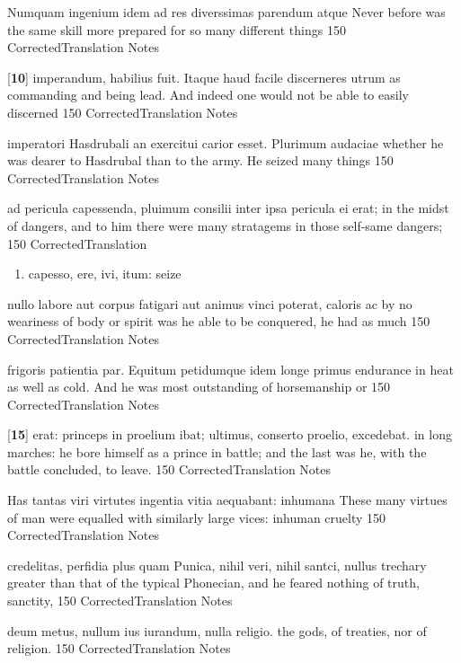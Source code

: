 \latline
  {Numquam ingenium idem ad res diverssimas parendum atque}
  { Never before was the same skill more prepared for so many different things  }
  {150}
  { CorrectedTranslation }
  { Notes }


\latline
  {[\textbf{10}] imperandum, habilius fuit.  Itaque haud facile discerneres utrum}
  { as commanding and being lead.  And indeed one would not be able to easily discerned }
  {150}
  { CorrectedTranslation }
  { Notes }


\latline
  {imperatori Hasdrubali an exercitui carior esset.  Plurimum audaciae}
  { whether he was dearer to Hasdrubal than to the army.  He seized many things }
  {150}
  { CorrectedTranslation }
  { Notes }


\latline
  {ad pericula capessenda, pluimum consilii inter ipsa pericula ei erat; }
  { in the midst of dangers, and to him there were many stratagems in those self-same dangers; }
  {150}
  { CorrectedTranslation }
  { \begin{enumerate}
  	\item capesso, ere, ivi, itum:  seize
  \end{enumerate} }


\latline
  {nullo labore aut corpus fatigari aut animus vinci poterat, caloris ac}
  { by no weariness of body or spirit was he able to be conquered, he had as much }
  {150}
  { CorrectedTranslation }
  { Notes }


\latline
  {frigoris patientia par.  Equitum petidumque idem longe primus}
  { endurance in heat as well as cold.  And he was most outstanding of horsemanship or  }
  {150}
  { CorrectedTranslation }
  { Notes }


\latline
  {[\textbf{15}] erat: princeps in proelium ibat; ultimus, conserto proelio, excedebat.}
  { in long marches: he bore himself as a prince in battle; and the last was he, with the battle concluded, to leave.}
  {150}
  { CorrectedTranslation }
  { Notes }


\latline
  {Has tantas viri virtutes ingentia vitia aequabant: inhumana }
  { These many virtues of man were equalled with similarly large vices:  inhuman cruelty }
  {150}
  { CorrectedTranslation }
  { Notes }


\latline
  {credelitas, perfidia plus quam Punica, nihil veri, nihil santci, nullus}
  { trechary greater than that of the typical Phonecian, and he feared nothing of truth, sanctity, }
  {150}
  { CorrectedTranslation }
  { Notes }


\latline
  {deum metus, nullum ius iurandum, nulla religio.}
  { the gods, of treaties, nor of religion. }
  {150}
  { CorrectedTranslation }
  { Notes }


